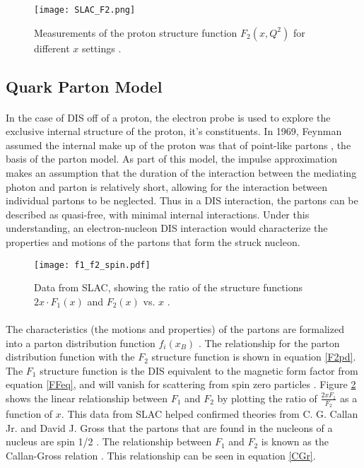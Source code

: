 \begin{figure}[]
	\centering
	\texttt{[image: SLAC\_F2.png]} 
	\caption{ Measurements of the proton structure function $F_2(x, Q^2)$ for different $x$ settings\cite{ref:rev_pp} .}
	\label{F2_fig}
\end{figure}

\subsection{Quark Parton Model}
\paragraph{}In the case of DIS off of a proton, the electron probe is used to explore the exclusive internal structure of the proton, it's constituents. In 1969, Feynman assumed the internal make up of the proton was that of point-like partons \cite{Briskin_thesis,DISproton}, the basis of the parton model. As part of this model, the impulse approximation makes an assumption that the duration of the interaction between the mediating photon and parton is relatively short, allowing for the interaction between individual partons to be neglected. Thus in a DIS interaction, the partons can be described as quasi-free, with minimal internal interactions. Under this understanding, an electron-nucleon DIS interaction would characterize the properties and motions of the partons that form the struck nucleon\cite{DISproton}.

\begin{figure}[t]
	\centering
	\texttt{[image: f1\_f2\_spin.pdf]} 
	\caption{Data from SLAC, showing the ratio of the structure functions $2x\cdot F_1(x)$ and $F_2(x)$ vs. $x$ \cite{PnN,IntroHEP}.}
	\label{fig:spin1/2}
\end{figure} 

\paragraph{}The characteristics (the motions and properties) of the partons are formalized into a parton distribution function $f_i(x_B)$ \cite{PnN}. The relationship for the parton distribution function with the $F_2$ structure function is shown in equation \ref{F2pd}. The $F_1$ structure function is the DIS equivalent to the magnetic form factor from equation \ref{FFeq}, and will vanish for scattering from spin zero particles \cite{PnN}. Figure \ref{fig:spin1/2} shows the linear relationship between $F_1$ and $F_2$ by plotting the ratio of $\frac{2xF_1}{F_2}$ as a function of $x$. This data from SLAC helped confirmed theories from C. G. Callan Jr. and David J. Gross that the partons that are found in the nucleons of a nucleus are spin 1/2 \cite{callan,DISquark}. The relationship between $F_1$ and $F_2$ is known as the Callan-Gross relation \cite{PnN}. This relationship can be seen in equation \ref{CGr}. 


